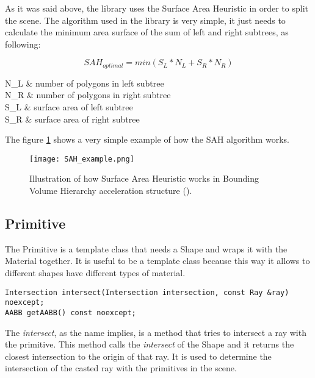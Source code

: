 \par
As it was said above, the library uses the Surface Area Heuristic in order to split the scene.
The algorithm used in the library is very simple, it just needs to calculate the minimum area surface of the sum of left and right subtrees, as following:

\begin{equation}
SAH_{optimal} = min(S_L * N_L + S_R * N_R)
\end{equation}

\begin{conditions}
	N_L & number of polygons in left subtree \\
	N_R & number of polygons in right subtree \\
	S_L & surface area of left subtree \\
	S_R & surface area of right subtree \\
\end{conditions}

\par
The figure \ref{SAH.} shows a very simple example of how the SAH algorithm works.

\begin{figure}[H]
	\centering
	\caption{Illustration of how Surface Area Heuristic works in Bounding Volume Hierarchy acceleration structure (\cite{SAH}).}
	\label{SAH.}
	\texttt{[image: SAH\_example.png]}
\end{figure}

\subsection{Primitive}

\par
The Primitive is a template class that needs a Shape and wraps it with the Material together.
It is useful to be a template class because this way it allows to different shapes have different types of material.

\begin{lstlisting}[caption={Main methods in Primitive}, captionpos=b, label=Primitive]
Intersection intersect(Intersection intersection, const Ray &ray) noexcept;
AABB getAABB() const noexcept;
\end{lstlisting}

\par
The \textit{intersect}, as the name implies, is a method that tries to intersect a ray with the primitive.
This method calls the \textit{intersect} of the Shape and it returns the closest intersection to the origin of that ray.
It is used to determine the intersection of the casted ray with the primitives in the scene.

